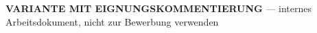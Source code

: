 \noindent\colorbox{yellow!25}{\parbox{\dimexpr\linewidth-2\fboxsep}{\textbf{VARIANTE MIT EIGNUNGSKOMMENTIERUNG} — internes Arbeitsdokument, nicht zur Bewerbung verwenden}}
